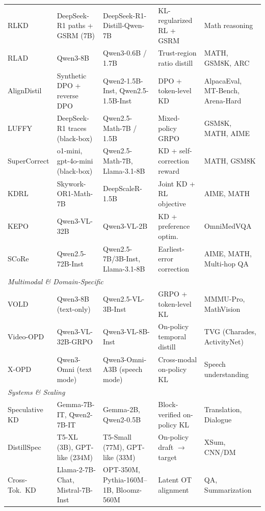\documentclass{article} %
\begin{document}
\begin{table}[t]
{\begin{tabular}{@{}lllll@{}}
        \midrule
        RLKD \citep{2505.16142} & DeepSeek-R1 paths + GSRM (7B) & DeepSeek-R1-Distill-Qwen-7B & KL-regularized RL + GSRM & Math reasoning \\
        RLAD \citep{2602.22495} & Qwen3-8B & Qwen3-0.6B / 1.7B & Trust-region ratio distill & MATH, GSM8K, ARC \\
        AlignDistil \citep{2503.02832} & Synthetic DPO + reverse DPO & Qwen2-1.5B-Inst, Qwen2.5-1.5B-Inst & DPO + token-level KD & AlpacaEval, MT-Bench, Arena-Hard \\
        LUFFY \citep{2504.14945} & DeepSeek-R1 traces (black-box) & Qwen2.5-Math-7B / 1.5B & Mixed-policy GRPO & GSM8K, MATH, AIME \\
        SuperCorrect \citep{2410.09008} & o1-mini, gpt-4o-mini (black-box) & Qwen2.5-Math-7B, Llama-3.1-8B & KD + self-correction reward & MATH, GSM8K \\
        KDRL \citep{2506.02208} & Skywork-OR1-Math-7B & DeepScaleR-1.5B & Joint KD + RL objective & AIME, MATH \\
        KEPO \citep{2602.00400} & Qwen3-VL-32B & Qwen3-VL-2B & KD + preference optim. & OmniMedVQA \\
        SCoRe \citep{2509.14257} & Qwen2.5-72B-Inst & Qwen2.5-7B/3B-Inst, Llama-3.1-8B & Earliest-error correction & AIME, MATH, Multi-hop QA \\
        \midrule
        \multicolumn{5}{l}{\textit{Multimodal \& Domain-Specific}} \\
        \midrule
        VOLD \citep{2510.23497} & Qwen3-8B (text-only) & Qwen2.5-VL-3B-Inst & GRPO + token-level KL & MMMU-Pro, MathVision \\
        Video-OPD \citep{2602.02994} & Qwen3-VL-32B-GRPO & Qwen3-VL-8B-Inst & On-policy temporal distill & TVG (Charades, ActivityNet) \\
        X-OPD \citep{2603.24596} & Qwen3-Omni (text mode) & Qwen3-Omni-A3B (speech mode) & Cross-modal on-policy KL & Speech understanding \\
        \midrule
        \multicolumn{5}{l}{\textit{Systems \& Scaling}} \\
        \midrule
        Speculative KD \citep{2410.11325} & Gemma-7B-IT, Qwen2-7B-IT & Gemma-2B, Qwen2-0.5B & Block-verified on-policy KL & Translation, Dialogue \\
        DistillSpec \citep{2310.08461} & T5-XL (3B), GPT-like (234M) & T5-Small (77M), GPT-like (33M) & On-policy draft $\to$ target & XSum, CNN/DM \\
        Cross-Tok.\ KD \citep{2402.12030} & Llama-2-7B-Chat, Mistral-7B-Inst & OPT-350M, Pythia-160M--1B, Bloomz-560M & Latent OT alignment & QA, Summarization \\

\end{tabular}}
\end{table}
\end{document}
